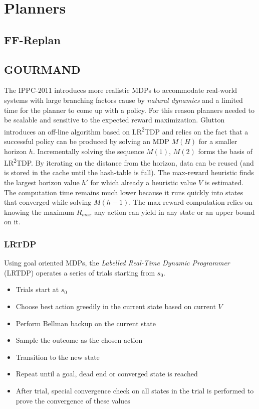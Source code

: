 \documentclass[runningheads,a4paper]{llncs}
\begin{document}

\section{Planners}
\label{sec:planners}

\subsection{FF-Replan}

\subsection{GOURMAND}

The IPPC-2011 introduces more realistic MDPs to accommodate real-world systems with large branching factors cause by \emph{natural dynamics} and a limited time for the planner to come up with a policy. For this reason planners needed to be scalable and sensitive to the expected reward maximization. Glutton introduces an off-line algorithm based on LR\textsuperscript{2}TDP and relies on the fact that a successful policy can be produced by solving an MDP $M(H)$ for a smaller horizon $h$. Incrementally solving the sequence $M(1)$, $M(2)$ forms the basis of LR\textsuperscript{2}TDP\@. By iterating on the distance from the horizon, data can be reused (and is stored in the cache until the hash-table is full). The max-reward heuristic finds the largest horizon value $h'$ for which already a heuristic value $V$ is estimated. The  computation time remains much lower because it runs quickly into states that converged while solving $M(h-1)$. The max-reward computation relies on knowing the maximum $R_{max}$ any action can yield in any state or an upper bound on it.

\subsubsection{LRTDP}
Using goal oriented MDPs, the \emph{Labelled Real-Time Dynamic Programmer} (LRTDP) operates a series of trials starting from $s_0$.

\begin{itemize}
	\item Trials start at $s_0$
	\item Choose best action greedily in the current state based on current $V$
	\item Perform  Bellman backup on the current state
	\item Sample the outcome as the chosen action
	\item Transition to the new state
	\item Repeat until a goal, dead end or converged state is reached
	\item After trial, special convergence check on all states in the trial is performed to prove the convergence of these values
\end{itemize}
\end{document}
